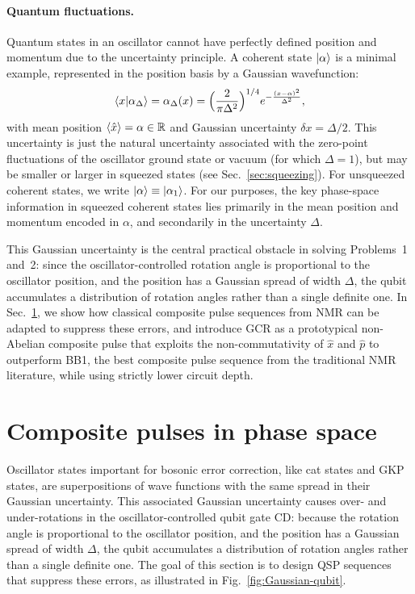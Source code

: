 \documentclass[aps,prx,showpacs,notitlepage,twocolumn,superscriptaddress,nofootinbib,preprintnumbers,floatfix,10pt, longbibliography]{revtex4-2}
\begin{document}
\paragraph{Quantum fluctuations.} Quantum states in an oscillator cannot have perfectly defined position and momentum due to the uncertainty principle. A coherent state $\ket{\alpha}$ is a minimal example, represented in the position basis by a Gaussian wavefunction:
\begin{align}
\braket{x|\alpha_\Delta} = \alpha_\Delta(x) = \Big(\frac{2}{\pi\Delta^2}\Big)^{1/4} e^{-\frac{(x - \alpha)^2}{\Delta^2}}, \label{eq:Gaussian}
\end{align}
with mean position $\braket{\hat x}=\alpha \in \mathbb{R}$ and Gaussian uncertainty $\delta x = \Delta/2$. This uncertainty is just the natural uncertainty associated with the zero-point fluctuations of the oscillator ground state or vacuum (for which $\Delta=1$), but may be smaller or larger in squeezed states (see Sec.~\ref{sec:squeezing}). For unsqueezed coherent states, we write $\ket{\alpha} \equiv \ket{\alpha_1}$. For our purposes, the key phase-space information in squeezed coherent states lies primarily in the mean position and momentum encoded in $\alpha$, and secondarily in the uncertainty $\Delta$.

This Gaussian uncertainty is the central practical obstacle in solving Problems~1 and~2: since the oscillator-controlled rotation angle is proportional to the oscillator position, and the position has a Gaussian spread of width $\Delta$, the qubit accumulates a distribution of rotation angles rather than a single definite one. In Sec.~\ref{sec:comp}, we show how classical composite pulse sequences from NMR can be adapted 
to suppress these errors, and introduce GCR as a prototypical non-Abelian composite pulse that 
exploits the non-commutativity of $\hat{x}$ and $\hat{p}$ to outperform BB1, the best composite 
pulse sequence from the traditional NMR literature, while using strictly lower circuit depth.

\section{Composite pulses in phase space}\label{sec:comp}

Oscillator states important for bosonic error correction, like cat states and GKP states, are superpositions of wave functions with the same spread in their Gaussian uncertainty. This associated Gaussian uncertainty causes over- and
under-rotations in the oscillator-controlled qubit gate CD: because the rotation angle is proportional 
to the oscillator position, and the position has a Gaussian spread of width $\Delta$, the qubit 
accumulates a distribution of rotation angles rather than a single definite one. The goal of this 
section is to design QSP sequences that suppress these errors, as illustrated in Fig.~\ref{fig:Gaussian-qubit}.
\end{document}
